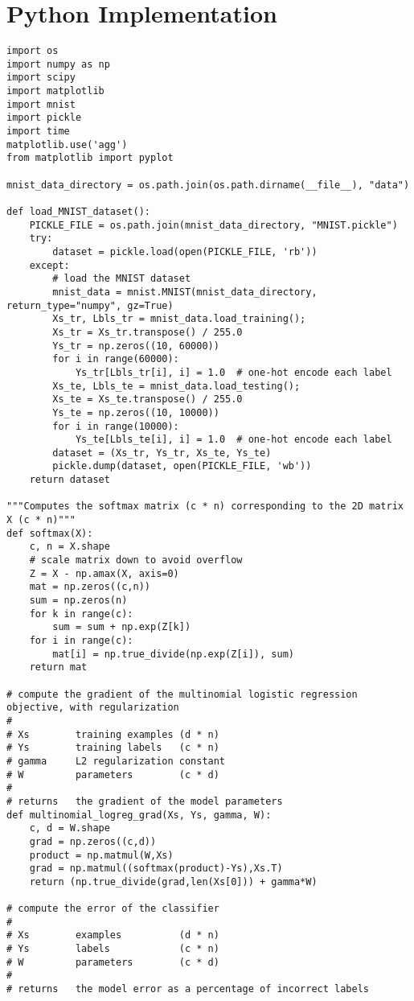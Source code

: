 \documentclass{article}
\begin{document}
 
 
  
\section*{Python Implementation } 
\begin{lstlisting} 
import os
import numpy as np
import scipy
import matplotlib
import mnist
import pickle
import time
matplotlib.use('agg')
from matplotlib import pyplot

mnist_data_directory = os.path.join(os.path.dirname(__file__), "data")

def load_MNIST_dataset():
	PICKLE_FILE = os.path.join(mnist_data_directory, "MNIST.pickle")
	try:
		dataset = pickle.load(open(PICKLE_FILE, 'rb'))
	except:
		# load the MNIST dataset
		mnist_data = mnist.MNIST(mnist_data_directory, return_type="numpy", gz=True)
		Xs_tr, Lbls_tr = mnist_data.load_training();
		Xs_tr = Xs_tr.transpose() / 255.0
		Ys_tr = np.zeros((10, 60000))
		for i in range(60000):
			Ys_tr[Lbls_tr[i], i] = 1.0  # one-hot encode each label
		Xs_te, Lbls_te = mnist_data.load_testing();
		Xs_te = Xs_te.transpose() / 255.0
		Ys_te = np.zeros((10, 10000))
		for i in range(10000):
			Ys_te[Lbls_te[i], i] = 1.0  # one-hot encode each label
		dataset = (Xs_tr, Ys_tr, Xs_te, Ys_te)
		pickle.dump(dataset, open(PICKLE_FILE, 'wb'))
	return dataset

"""Computes the softmax matrix (c * n) corresponding to the 2D matrix X (c * n)"""
def softmax(X):
	c, n = X.shape
	# scale matrix down to avoid overflow
	Z = X - np.amax(X, axis=0)
	mat = np.zeros((c,n))
	sum = np.zeros(n)
	for k in range(c):
		sum = sum + np.exp(Z[k])
	for i in range(c):
		mat[i] = np.true_divide(np.exp(Z[i]), sum)
	return mat

# compute the gradient of the multinomial logistic regression objective, with regularization
#
# Xs        training examples (d * n)
# Ys        training labels   (c * n)
# gamma     L2 regularization constant
# W         parameters        (c * d)
#
# returns   the gradient of the model parameters
def multinomial_logreg_grad(Xs, Ys, gamma, W):
	c, d = W.shape
	grad = np.zeros((c,d))
	product = np.matmul(W,Xs)
	grad = np.matmul((softmax(product)-Ys),Xs.T)
	return (np.true_divide(grad,len(Xs[0])) + gamma*W)

# compute the error of the classifier
#
# Xs        examples          (d * n)
# Ys        labels            (c * n)
# W         parameters        (c * d)
#
# returns   the model error as a percentage of incorrect labels


\end{lstlisting}
\end{document}
